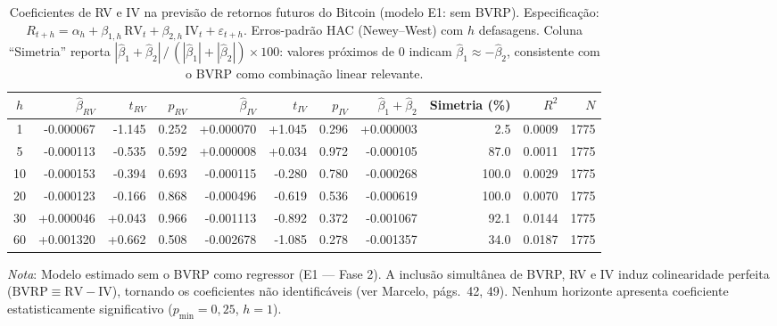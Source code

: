 \begin{table}[H]
\centering
\caption{Coeficientes de RV e IV na previs\~ao de retornos futuros do Bitcoin (modelo E1: sem BVRP). Especifica\c{c}\~ao: $R_{t+h} = \alpha_h + \beta_{1,h}\,\text{RV}_t + \beta_{2,h}\,\text{IV}_t + \varepsilon_{t+h}$. Erros-padr\~ao HAC (Newey--West) com $h$ defasagens. Coluna ``Simetria'' reporta $|\hat{\beta}_1 + \hat{\beta}_2| \,/\,(|\hat{\beta}_1| + |\hat{\beta}_2|) \times 100$: valores pr\'{o}ximos de 0 indicam $\hat{\beta}_1 \approx -\hat{\beta}_2$, consistente com o BVRP como combina\c{c}\~ao linear relevante.}
\label{tab:retlin-componentes}
\footnotesize
\begin{adjustbox}{max width=\textwidth}
\begin{tabular}{crrrrrrrrrr}
\toprule
$h$ & $\hat{\beta}_{RV}$ & $t_{RV}$ & $p_{RV}$ & $\hat{\beta}_{IV}$ & $t_{IV}$ & $p_{IV}$ & $\hat{\beta}_1{+}\hat{\beta}_2$ & Simetria (\%) & $R^2$ & $N$ \\
\midrule
  1 & -0.000067 & -1.145 & 0.252 & +0.000070 & +1.045 & 0.296 & +0.000003 & 2.5 & 0.0009 & 1775 \\
  5 & -0.000113 & -0.535 & 0.592 & +0.000008 & +0.034 & 0.972 & -0.000105 & 87.0 & 0.0011 & 1775 \\
 10 & -0.000153 & -0.394 & 0.693 & -0.000115 & -0.280 & 0.780 & -0.000268 & 100.0 & 0.0029 & 1775 \\
 20 & -0.000123 & -0.166 & 0.868 & -0.000496 & -0.619 & 0.536 & -0.000619 & 100.0 & 0.0070 & 1775 \\
 30 & +0.000046 & +0.043 & 0.966 & -0.001113 & -0.892 & 0.372 & -0.001067 & 92.1 & 0.0144 & 1775 \\
 60 & +0.001320 & +0.662 & 0.508 & -0.002678 & -1.085 & 0.278 & -0.001357 & 34.0 & 0.0187 & 1775 \\
\bottomrule
\end{tabular}
\end{adjustbox}
\smallskip
\begin{minipage}{0.96\linewidth}
\footnotesize\textit{Nota}: Modelo estimado sem o BVRP como regressor (E1 --- Fase 2). A inclus\~ao simult\^anea de BVRP, RV e IV induz colinearidade perfeita ($\text{BVRP} \equiv \text{RV} - \text{IV}$), tornando os coeficientes n\~ao identific\'aveis (ver Marcelo, p\'ags.\ 42, 49). Nenhum horizonte apresenta coeficiente estatisticamente significativo ($p_{\min} = 0{,}25$, $h = 1$).
\end{minipage}
\end{table}

